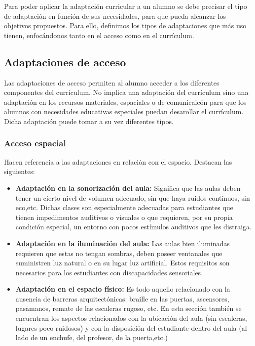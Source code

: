 Para poder aplicar la adaptación curricular a un alumno se debe precisar el tipo de adaptación en función de sus necesidades, para que pueda alcanzar los objetivos propuestos. Para ello, definimos los tipos de adaptaciones que más uso tienen, enfocándonos tanto en el acceso como en el currículum.

\subsection{Adaptaciones de acceso}
Las adaptaciones de acceso permiten al alumno acceder a los diferentes componentes del currículum. No implica una adaptación del currículum sino una adaptación en los recursos materiales, espaciales o de comunicaicón para que los alumnos con necesidades educativas especiales puedan desarollar el currículum.
Dicha adaptación puede tomar a su vez diferentes tipos.

\subsubsection{Acceso espacial}
Hacen referencia a las adaptaciones en relación con el espacio. Destacan las siguientes:
\begin{itemize}
    \item \textbf{Adaptación en la sonorización del aula:} Significa que las aulas deben tener un cierto nivel de volumen adecuado, sin que haya ruidos contínuos, sin eco,etc. Dichas clases son especialmente adecuadas para estudiantes que tienen impedimentos auditivos o visuales o que requieren, por su propia condición especial, un entorno con pocos estímulos auditivos que les distraiga.
    \item \textbf{Adaptación en la iluminación del aula:} Las aulas bien iluminadas requieren que estas no tengan sombras, deben poseer ventanales que suministren luz natural o en su lugar luz artificial. Estos requisitos son necesarios para los estudiantes con discapacidades sensoriales.
    \item \textbf{Adaptación en el espacio físico:} Es todo aquello relacionado con la ausencia de barreras arquitectónicas:  braille en las puertas, ascensores, pasamanos, remate de las escaleras rugoso, etc. En esta sección también se encuentran los aspectos relacionados con la ubicación del aula (sin escaleras, lugares poco ruidosos) y con la disposición del estudiante dentro del aula (al lado de un enchufe, del profesor, de la puerta,etc.)
\end{itemize}

